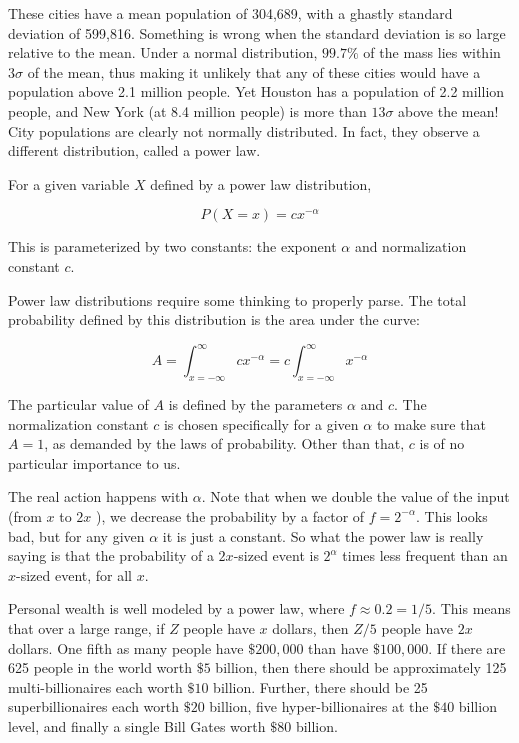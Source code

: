 \documentclass[10pt]{article}
\begin{document}
These cities have a mean population of 304,689, with a ghastly standard deviation of 599,816. Something is wrong when the standard deviation is so large relative to the mean. Under a normal distribution, $99.7 \%$ of the mass lies within $3 \sigma$ of the mean, thus making it unlikely that any of these cities would have a population above 2.1 million people. Yet Houston has a population of 2.2 million people, and New York (at 8.4 million people) is more than $13 \sigma$ above the mean! City populations are clearly not normally distributed. In fact, they observe a different distribution, called a power law.


For a given variable $X$ defined by a power law distribution,

\[
P(X=x)=c x^{-\alpha}
\]

This is parameterized by two constants: the exponent $\alpha$ and normalization constant $c$.

Power law distributions require some thinking to properly parse. The total probability defined by this distribution is the area under the curve:

\[
A=\int_{x=-\infty}^{\infty} c x^{-\alpha}=c \int_{x=-\infty}^{\infty} x^{-\alpha}
\]

The particular value of $A$ is defined by the parameters $\alpha$ and $c$. The normalization constant $c$ is chosen specifically for a given $\alpha$ to make sure that $A=1$, as demanded by the laws of probability. Other than that, $c$ is of no particular importance to us.

The real action happens with $\alpha$. Note that when we double the value of the input (from $x$ to $2 x$ ), we decrease the probability by a factor of $f=2^{-\alpha}$. This looks bad, but for any given $\alpha$ it is just a constant. So what the power law is really saying is that the probability of a $2 x$-sized event is $2^{\alpha}$ times less frequent than an $x$-sized event, for all $x$.

Personal wealth is well modeled by a power law, where $f \approx 0.2=1 / 5$. This means that over a large range, if $Z$ people have $x$ dollars, then $Z / 5$ people have $2 x$ dollars. One fifth as many people have $\$ 200,000$ than have $\$ 100,000$. If there are 625 people in the world worth $\$ 5$ billion, then there should be approximately 125 multi-billionaires each worth $\$ 10$ billion. Further, there should be 25 superbillionaires each worth $\$ 20$ billion, five hyper-billionaires at the $\$ 40$ billion level, and finally a single Bill Gates worth $\$ 80$ billion.
\end{document}
